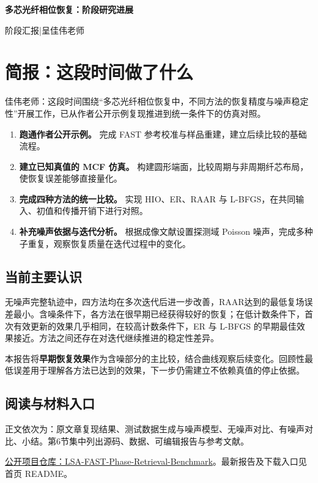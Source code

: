 \documentclass[UTF8,a4paper,11pt,fontset=fandol]{ctexart}
\begin{document}
\begin{center}{\LARGE\bfseries 多芯光纤相位恢复：阶段研究进展}\par\vspace{5pt}阶段汇报\quad |\quad 呈佳伟老师\end{center}
\section{简报：这段时间做了什么}
佳伟老师：这段时间围绕“多芯光纤相位恢复中，不同方法的恢复精度与噪声稳定性”开展工作，已从作者公开示例复现推进到统一条件下的仿真对照。
\begin{enumerate}
\item \textbf{跑通作者公开示例。} 完成 FAST 参考校准与样品重建，建立后续比较的基础流程。
\item \textbf{建立已知真值的 MCF 仿真。} 构建圆形端面，比较周期与非周期纤芯布局，使恢复误差能够直接量化。
\item \textbf{完成四种方法的统一比较。} 实现 HIO、ER、RAAR 与 L-BFGS，在共同输入、初值和传播开销下进行对照。
\item \textbf{补充噪声依据与迭代分析。} 根据成像文献设置探测域 Poisson 噪声，完成多种子重复，观察恢复质量在迭代过程中的变化。
\end{enumerate}
\subsection*{当前主要认识}
无噪声完整轨迹中，四方法均在多次迭代后进一步改善，RAAR达到的最低复场误差最小。含噪条件下，各方法在很早期已经获得较好的恢复；在低计数条件下，首次有效更新的效果几乎相同，在较高计数条件下，ER 与 L-BFGS 的早期最佳效果接近。方法之间还存在对迭代继续推进的稳定性差异。

本报告将\textbf{早期恢复效果}作为含噪部分的主比较，结合曲线观察后续变化。回顾性最低误差用于理解各方法已达到的效果，下一步仍需建立不依赖真值的停止依据。
\subsection*{阅读与材料入口}
正文依次为：原文章复现结果、测试数据生成与噪声模型、无噪声对比、有噪声对比、小结。第6节集中列出源码、数据、可编辑报告与参考文献。

\href{https://github.com/BoVVENGibNieAuf/LSA-FAST-Phase-Retrieval-Benchmark}{公开项目仓库：LSA-FAST-Phase-Retrieval-Benchmark}。最新报告及下载入口见首页 README。
\clearpage
\end{document}
